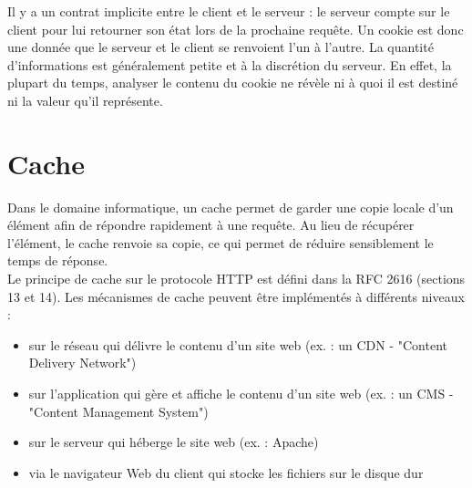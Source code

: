 Il y a un contrat implicite entre le client et le serveur : le serveur compte sur le client pour lui retourner son état lors de la prochaine requête. Un cookie est donc une donnée que le serveur et le client se renvoient l'un à l'autre. La quantité d'informations est généralement petite et à la discrétion du serveur. En effet, la plupart du temps, analyser le contenu du cookie ne révèle ni à quoi il est destiné ni la valeur qu'il représente.


\section{Cache}
Dans le domaine informatique, un cache permet de garder une copie locale d'un élément afin de répondre rapidement à une requête. Au lieu de récupérer l'élément, le cache renvoie sa copie, ce qui permet de réduire sensiblement le temps de réponse.\\
Le principe de cache sur le protocole HTTP est défini dans la RFC 2616 \cite{IETF_RFC2616} (sections 13 et 14). Les mécanismes de cache peuvent être implémentés à différents niveaux :
\begin{itemize}
  \item sur le réseau qui délivre le contenu d'un site web (ex. : un CDN - "Content Delivery Network")
  \item sur l'application qui gère et affiche le contenu d'un site web (ex. : un CMS - "Content Management System")
  \item sur le serveur qui héberge le site web (ex. : Apache)
  \item via le navigateur Web du client qui stocke les fichiers sur le disque dur
  \newline
\end{itemize}

